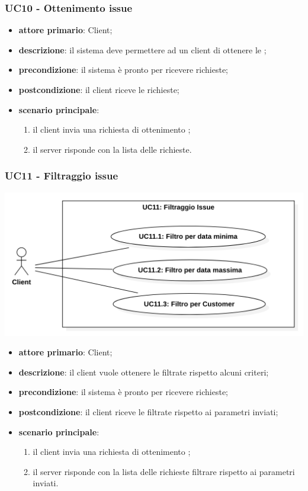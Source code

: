 \subsubsection{UC10 - Ottenimento issue}
\begin{itemize}
	\item \textbf{attore primario}: Client;
	\item \textbf{descrizione}: il sistema deve permettere ad un client di ottenere le ;
	\item \textbf{precondizione}: il sistema è pronto per ricevere richieste;
	\item \textbf{postcondizione}: il client riceve le  richieste;
	\item \textbf{scenario principale}: 
	\begin{enumerate}
		\item il client invia una richiesta di ottenimento ;
		\item il server risponde con la lista delle  richieste.
	\end{enumerate}
\end{itemize}
\subsubsection{UC11 - Filtraggio issue}
\begin{center}
	\includegraphics[keepaspectratio = true, width=15cm]{immagini/uc/8.png}
\end{center}
\begin{itemize}
	\item \textbf{attore primario}: Client;
	\item \textbf{descrizione}: il client vuole ottenere le  filtrate rispetto alcuni criteri;
	\item \textbf{precondizione}: il sistema è pronto per ricevere richieste;
	\item \textbf{postcondizione}:  il client riceve le  filtrate rispetto ai parametri inviati;
	\item \textbf{scenario principale}: 
	\begin{enumerate}
		\item il client invia una richiesta di ottenimento ;
		\item il server risponde con la lista delle  richieste filtrare rispetto ai parametri inviati.
	\end{enumerate}
\end{itemize}
